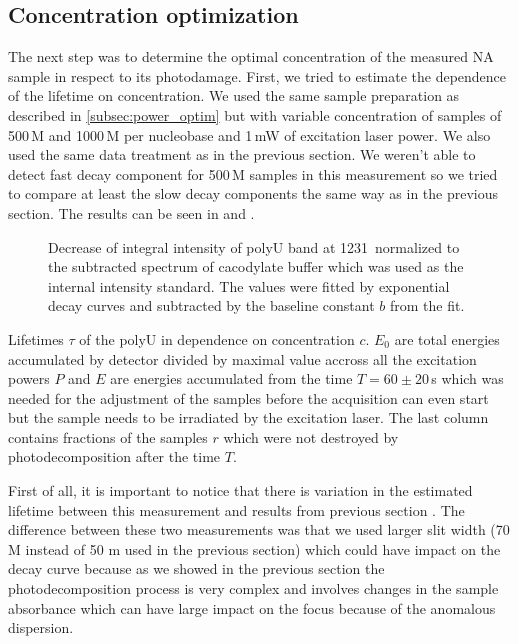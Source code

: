 \subsection{Concentration optimization}

The next step was to determine the optimal concentration of the measured NA
sample in respect to its photodamage.
First, we tried to estimate the dependence of the lifetime on concentration. We
used the same sample preparation as described in
\cref{subsec:power_optim}
but with variable concentration of samples of 500\,M and 1000\,M per
nucleobase and 1\,mW of excitation laser power. We also used the same data
treatment as in the previous section. We weren't able to detect fast decay
component for 500\,M samples in this measurement so we tried to compare
at least the slow decay components the same way as in the previous section.
The results can be seen in
and
.

\begin{figure}
	\centering
	
	\caption{Decrease of integral intensity of polyU band at 1231\,\icm{}
		normalized to the subtracted spectrum of cacodylate buffer which was used
		as the internal intensity standard. The values were fitted by exponential
		decay curves  and subtracted by the baseline
		constant $b$ from the fit.}
	\label{\figlabel{conc_optim:triplexes}}
\end{figure}

\begin{table}
	\centering
	
	\caption{Lifetimes $\tau$ of the polyU in dependence on concentration
		$c$. $E_0$ are total energies accumulated by detector divided by maximal
		value accross all the excitation powers $P$ and $E$ are energies
		accumulated from the time $T = 60\pm20$\,s which was needed for the
		adjustment of the samples before the acquisition can even start but
		the sample needs to be irradiated by the excitation laser. The last column
		contains fractions of the samples $r$ which were not destroyed by
		photodecomposition after the time $T$.
	}
	\label{\tablabel{conc_optim:lifetimes_triplexes}}
\end{table}

First of all, it is important to notice that there is variation in the
estimated lifetime between this measurement and results from previous section
. The difference between these two
measurements was that we used larger slit width (70 M instead of 50 m
used in the previous section) which could have impact on the decay curve
because as we showed in the previous section the photodecomposition process
is very complex and involves changes in the sample absorbance which can have
large impact on the focus because of the anomalous dispersion.

